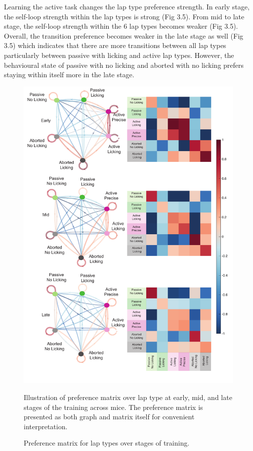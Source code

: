 Learning the active task changes the lap type preference strength. In early stage, the self-loop strength within the lap types is strong (Fig 3.5). From mid to late stage, the self-loop strength within the 6 lap types becomes weaker (Fig 3.5). Overall, the transition preference becomes weaker in the late stage as well (Fig 3.5) which indicates that there are more transitions between all lap types particularly between passive with licking and active lap types. However, the behavioural state of passive with no licking and aborted with no licking prefers staying within itself more in the late stage. 





\begin{figure}
    \centering
    \includegraphics[width=1\linewidth]{figures//Chapter 3 Behaviour//Thesis Figures//figure_PDFs/fig5_preference_index_each_stage.pdf}
    \caption{Preference matrix for lap types over stages of training.}
\medskip
\small
Illustration of preference matrix over lap type at early, mid, and late stages of the training across mice. The preference matrix is presented as both graph and matrix itself for convenient interpretation.
    \label{fig:preference matrices over learning}
\end{figure}





